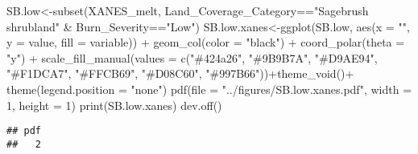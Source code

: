 \documentclass[
]{article}
\newenvironment{Shaded}{\begin{snugshade}}{\end{snugshade}}
\newcommand{\AttributeTok}[1]{\textcolor[rgb]{0.77,0.63,0.00}{#1}}
\newcommand{\DecValTok}[1]{\textcolor[rgb]{0.00,0.00,0.81}{#1}}
\newcommand{\FunctionTok}[1]{\textcolor[rgb]{0.00,0.00,0.00}{#1}}
\newcommand{\NormalTok}[1]{#1}
\newcommand{\OtherTok}[1]{\textcolor[rgb]{0.56,0.35,0.01}{#1}}
\newcommand{\SpecialCharTok}[1]{\textcolor[rgb]{0.00,0.00,0.00}{#1}}
\newcommand{\StringTok}[1]{\textcolor[rgb]{0.31,0.60,0.02}{#1}}
\begin{document}
\begin{Shaded}
\begin{Highlighting}[]
\NormalTok{SB.low}\OtherTok{\textless{}{-}}\FunctionTok{subset}\NormalTok{(XANES\_melt, Land\_Coverage\_Category}\SpecialCharTok{==}\StringTok{"Sagebrush shrubland"} \SpecialCharTok{\&}\NormalTok{ Burn\_Severity}\SpecialCharTok{==}\StringTok{"Low"}\NormalTok{)}
\NormalTok{SB.low.xanes}\OtherTok{\textless{}{-}}\FunctionTok{ggplot}\NormalTok{(SB.low, }\FunctionTok{aes}\NormalTok{(}\AttributeTok{x =} \StringTok{""}\NormalTok{, }\AttributeTok{y =}\NormalTok{ value, }\AttributeTok{fill =}\NormalTok{ variable)) }\SpecialCharTok{+}
    \FunctionTok{geom\_col}\NormalTok{(}\AttributeTok{color =} \StringTok{"black"}\NormalTok{) }\SpecialCharTok{+}
    \FunctionTok{coord\_polar}\NormalTok{(}\AttributeTok{theta =} \StringTok{"y"}\NormalTok{) }\SpecialCharTok{+} \FunctionTok{scale\_fill\_manual}\NormalTok{(}\AttributeTok{values =} \FunctionTok{c}\NormalTok{(}\StringTok{"\#424a26"}\NormalTok{, }\StringTok{"\#9B9B7A"}\NormalTok{, }\StringTok{"\#D9AE94"}\NormalTok{, }\StringTok{"\#F1DCA7"}\NormalTok{, }\StringTok{"\#FFCB69"}\NormalTok{, }\StringTok{"\#D08C60"}\NormalTok{, }\StringTok{"\#997B66"}\NormalTok{))}\SpecialCharTok{+}\FunctionTok{theme\_void}\NormalTok{()}\SpecialCharTok{+}
    \FunctionTok{theme}\NormalTok{(}\AttributeTok{legend.position =} \StringTok{"none"}\NormalTok{)}
\FunctionTok{pdf}\NormalTok{(}\AttributeTok{file =} \StringTok{"../figures/SB.low.xanes.pdf"}\NormalTok{, }\AttributeTok{width =} \DecValTok{1}\NormalTok{, }\AttributeTok{height =} \DecValTok{1}\NormalTok{) }
\FunctionTok{print}\NormalTok{(SB.low.xanes)}
\FunctionTok{dev.off}\NormalTok{()}
\end{Highlighting}
\end{Shaded}

\begin{verbatim}
## pdf 
##   2
\end{verbatim}
\end{document}
